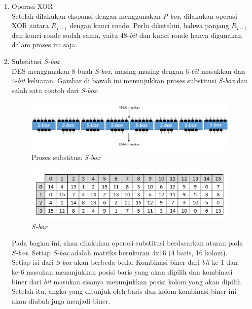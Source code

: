 \begin{enumerate}
	\item Operasi XOR\\
	Setelah dilakukan ekspansi dengan menggunakan \textit{P-box}, dilakukan operasi XOR antara \begin{math}R_{I-1}\end{math} dengan kunci ronde. Perlu diketahui, bahwa panjang \begin{math}R_{I-1}\end{math} dan kunci ronde sudah sama, yaitu 48-\textit{bit} dan kunci ronde hanya digunakan dalam proses ini saja.

	\item Substitusi \textit{S-box}\\
	DES menggunakan 8 buah \textit{S-box}, masing-masing dengan 6-\textit{bit} masukkan dan 4-\textit{bit} keluaran. Gambar di bawah ini menunjukkan proses substitusi \textit{S-box} dan salah satu contoh dari \textit{S-box}.
	
\begin{figure}[h]
	\includegraphics[scale=0.5]{Gambar/S-box}
	\centering
	\caption{Proses substitusi \textit{S-box}}
\end{figure}
	
\begin{figure}[ht]
	\includegraphics[scale=0.8]{Gambar/S-box1}
	\centering
	\caption{\textit{S-box}}
\end{figure}

	Pada bagian ini, akan dilakukan operasi substitusi berdasarkan aturan pada \textit{S-box}. Setiap \textit{S-box} adalah matriks berukuran 4x16 (4 baris, 16 kolom). Setiap isi dari \textit{S-box} akan berbeda-beda. Kombinasi biner dari \textit{bit} ke-1 dan ke-6 masukan menunjukkan posisi baris yang akan dipilih dan kombinasi biner dari \textit{bit} masukan sisanya menunjukkan posisi kolom yang akan dipilih. Setelah itu, angka yang ditunjuk oleh baris dan kolom kombinasi biner ini akan diubah juga menjadi biner.


\end{enumerate}
